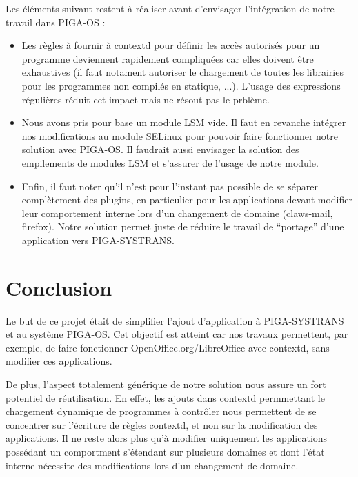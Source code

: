 \documentclass[pdftex,a4paper,titlepage,11pt]{article}
\begin{document}
Les éléments suivant restent à réaliser avant d'envisager l'intégration de notre travail dans PIGA-OS :
	\begin{itemize}
		\item Les règles à fournir à contextd pour définir les accès autorisés pour un programme deviennent rapidement compliquées car elles doivent être exhaustives (il faut notament autoriser le chargement de toutes les librairies pour les programmes non compilés en statique, ...). L'usage des expressions régulières réduit cet impact mais ne résout pas le prblème.
		\item Nous avons pris pour base un module LSM vide. Il faut en revanche intégrer nos modifications au module SELinux pour pouvoir faire fonctionner notre solution avec PIGA-OS. Il faudrait aussi envisager la solution des empilements de modules LSM et s'assurer de l'usage de notre module.
		\item Enfin, il faut noter qu'il n'est pour l'instant pas possible de se séparer complètement des plugins, en particulier pour les applications devant modifier leur comportement interne lors d'un changement de domaine (claws-mail, firefox). Notre solution permet juste de réduire le travail de ``portage'' d'une application vers PIGA-SYSTRANS.
	\end{itemize}

\newpage

% 
% 

\section*{Conclusion} 

Le but de ce projet était de simplifier l'ajout d'application à PIGA-SYSTRANS et au système PIGA-OS. Cet objectif est atteint car nos travaux permettent, par exemple, de faire fonctionner OpenOffice.org/LibreOffice avec contextd, sans modifier ces applications.

De plus, l'aspect totalement générique de notre solution nous assure un fort potentiel de réutilisation. En effet, les ajouts dans contextd permmettant le chargement dynamique de programmes à contrôler nous permettent de se concentrer sur l'écriture de règles contextd, et non sur la modification des applications. Il ne reste alors plus qu'à modifier uniquement les applications possédant un comportment s'étendant sur plusieurs domaines et dont l'état interne nécessite des modifications lors d'un changement de domaine.
\end{document}

